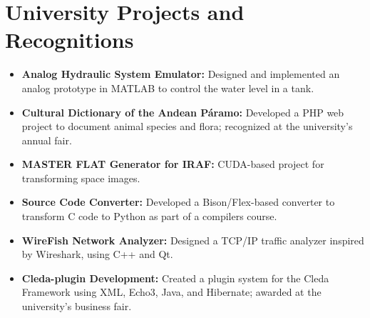 \documentclass[a4paper,10pt]{article}
\begin{document}
\section*{University Projects and Recognitions}
\sectionline
\begin{itemize}[leftmargin=0.5cm, topsep=0pt, parsep=0pt, itemsep=2pt]
    \item \textbf{Analog Hydraulic System Emulator:} Designed and implemented an analog prototype in MATLAB to control the water level in a tank.
    \item \textbf{Cultural Dictionary of the Andean Páramo:} Developed a PHP web project to document animal species and flora; recognized at the university's annual fair.
    \item \textbf{MASTER FLAT Generator for IRAF:} CUDA-based project for transforming space images.
    \item \textbf{Source Code Converter:} Developed a Bison/Flex-based converter to transform C code to Python as part of a compilers course.
    \item \textbf{WireFish Network Analyzer:} Designed a TCP/IP traffic analyzer inspired by Wireshark, using C++ and Qt.
    \item \textbf{Cleda-plugin Development:} Created a plugin system for the Cleda Framework using XML, Echo3, Java, and Hibernate; awarded at the university's business fair.
\end{itemize}
\end{document}
